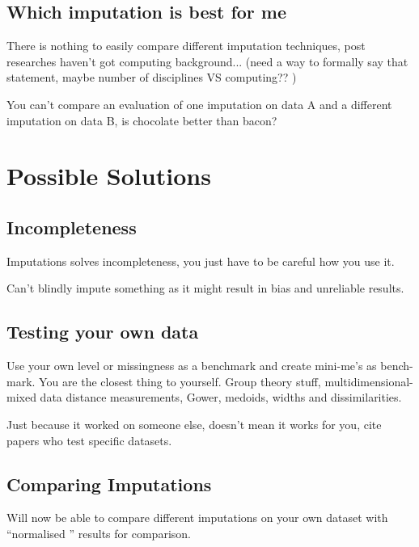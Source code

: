 \documentclass{IEEEconf}
\begin{document}
		\subsection{Which imputation is best for me} %
		\label{sub:which_imputation_is_best_for_me}
		There is nothing to easily compare different imputation techniques, post researches haven't got computing background... (need a way to formally say that statement, maybe number of disciplines VS computing?? ) 

		You can't compare an evaluation of one imputation on data A and a different imputation on data B, is chocolate better than bacon? 

	\section{Possible Solutions} %
	\label{sec:a_solution}
		\subsection{Incompleteness} %
		\label{sub:incompleteness}
		Imputations solves incompleteness, you just have to be careful how you use it. 

		Can't blindly impute something as it might result in bias and unreliable results. 
		\subsection{Testing your own data} %
		\label{sub:testing_your_own_data}
		Use your own level or missingness as a benchmark and create mini-me's as bench-mark. You are the closest thing to yourself. 
		Group theory stuff, multidimensional-mixed data distance measurements, Gower, medoids, widths and dissimilarities.

		Just because it worked on someone else, doesn't mean it works for you, cite papers who test specific datasets. 
		\subsection{Comparing Imputations} %
		\label{sub:comparing_imputations}
		Will now be able to compare different imputations on your own dataset with ``normalised '' results for comparison. 
\end{document}
